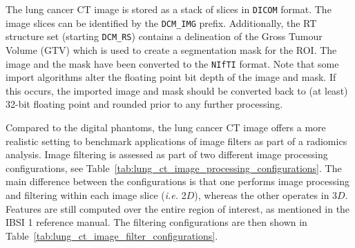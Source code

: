 \documentclass[fleqn,a4paper,oneside,openany]{book}
\begin{document}
The lung cancer CT image is stored as a stack of slices in \texttt{DICOM} format. The image slices can be identified by the \texttt{DCM\_IMG} prefix. Additionally, the RT structure set (starting \texttt{DCM\_RS}) contains a delineation of the Gross Tumour Volume (GTV) which is used to create a segmentation mask for the ROI. The image and the mask have been converted to the \texttt{NIfTI} format. Note that some import algorithms alter the floating point bit depth of the image and mask. If this occurs, the imported image and mask should be converted back to (at least) 32-bit floating point and rounded prior to any further processing.

Compared to the digital phantoms, the lung cancer CT image offers a more realistic setting to benchmark applications of image filters as part of a radiomics analysis. Image filtering is assessed as part of two different image processing configurations, see Table~\ref{tab:lung_ct_image_processing_configurations}. The main difference between the configurations is that one performs image processing and filtering within each image slice (\textit{i.e.} 2$D$), whereas the other operates in 3$D$. Features are still computed over the entire region of interest, as mentioned in the IBSI 1 reference manual. The filtering configurations are then shown in Table~\ref{tab:lung_ct_image_filter_configurations}.

\end{document}
